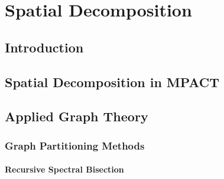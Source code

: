 \chapter{Spatial Decomposition}{\label{ch:Spatial Decomposition}
  \section{Introduction}{\label{sec:Spatial Decomposition:Introduction}
    \blindtext[5]
  }
  \section{Spatial Decomposition in MPACT}{\label{sec:Spatial Decomposition:Spatial Decomposition in MPACT}
    \blindtext[3]
  }
  \section{Applied Graph Theory}{\label{sec:Spatial Decomposition:Applied Graph Theory}
    \blindtext[2]
    \subsection{Graph Partitioning Methods}{\label{ssec:Spatial Decomposition:Graph Partitioning Methods}
      \blindtext[2]
      \subsubsection{Recursive Spectral Bisection}{\label{sssec:Spatial Decomposition:Recursive Spectral Bisection}
        \blindtext[4]
      }
}}}
